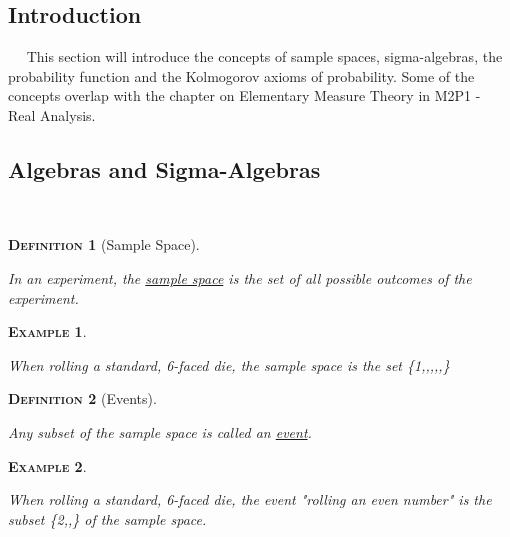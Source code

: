 \documentclass[12pt,a4paper]{article}
\newtheorem{definition}{\textsc{Definition}}[section]
\newtheorem{example}{\textsc{Example}}[section]
\begin{document}
\subsection{Introduction}

$\quad$ This section will introduce the concepts of sample spaces, sigma-algebras, the probability function and the Kolmogorov axioms of probability. Some of the concepts overlap with the chapter on Elementary Measure Theory in M2P1 - Real Analysis.
\vspace{12pt}


\subsection{Algebras and Sigma-Algebras}$\;$

\begin{definition}[Sample Space]$\;$\par
\vspace{12pt}

In an experiment, the \underline{sample space} is the set of all possible outcomes of the experiment.\end{definition}

\begin{example}$\;$\par
\vspace{12pt}

When rolling a standard, 6-faced die, the sample space is the set \{1,,,,,\}\end{example}

\begin{definition}[Events]$\;$\par
\vspace{12pt}

Any subset of the sample space is called an \underline{event}.\end{definition}

\begin{example}$\;$\par
\vspace{12pt}

When rolling a standard, 6-faced die, the event "rolling an even number" is the subset \{2,,\} of the sample space.\end{example}
\end{document}
